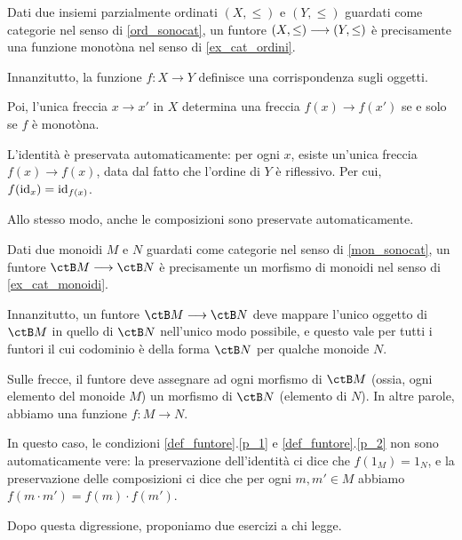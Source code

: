 \begin{example}\label{exa_monotone_funtori}
	Dati due insiemi parzialmente ordinati \((X,\le)\) e \((Y,\le)\) guardati come categorie nel senso di \ref{ord_sonocat}, un funtore \((X,\le)\longrightarrow(Y,\le)\) è precisamente una funzione monotòna nel senso di \ref{ex_cat_ordini}.

	Innanzitutto, la funzione \(f:X\to Y\) definisce una corrispondenza sugli oggetti.

	Poi, l'unica freccia \(x\to x'\) in \(X\) determina una freccia \(f(x)\to f(x')\) se e solo se \(f\) è monotòna.%

	L'identità è preservata automaticamente: per ogni \(x\), esiste un'unica freccia \(f(x)\to f(x)\), data dal fatto che l'ordine di \(Y\) è riflessivo. Per cui, \(f(\mathrm{id}_{x})=\mathrm{id}_{f(x)}\).

	Allo stesso modo, anche le composizioni sono preservate automaticamente.
\end{example}

\begin{example}\label{exa_funtori_da_gruppi}
	Dati due monoidi \(M\) e \(N\) guardati come categorie nel senso di \ref{mon_sonocat}, un funtore \(\ctB M\fun \ctB N\) è precisamente un morfismo di monoidi nel senso di \ref{ex_cat_monoidi}.

	Innanzitutto, un funtore \(\ctB M\fun \ctB N\) deve mappare l'unico oggetto di \(\ctB M\) in quello di \(\ctB N\) nell'unico modo possibile, e questo vale per tutti i funtori il cui codominio è della forma \(\ctB N\) per qualche monoide \(N\).

	Sulle frecce, il funtore deve assegnare ad ogni morfismo di \(\ctB M\) (ossia, ogni elemento del monoide \(M\)) un morfismo di \(\ctB N\) (elemento di \(N\)). In altre parole, abbiamo una funzione \(f:M\to N\).

	In questo caso, le condizioni \ref{def_funtore}.\ref{p_1} e \ref{def_funtore}.\ref{p_2} non sono automaticamente vere: la preservazione dell'identità ci dice che \(f(1_M)=1_N\), e la preservazione delle composizioni ci dice che per ogni \(m,m'\in M\) abbiamo \(f(m\cdot m')=f(m)\cdot f(m')\).
\end{example}
\begin{remark}
\end{remark}
Dopo questa digressione, proponiamo due esercizi a chi legge.

